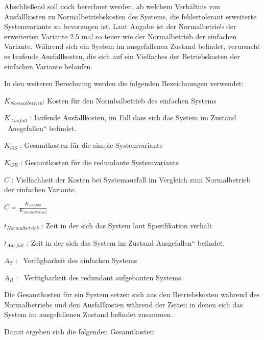 \documentclass[a4paper]{article}
\title{}
\author{}
\date{2015-06-18T21:48:05.083000000}
\begin{document}
Abschlie{\ss}end soll noch berechnet werden, ab welchem Verh\"altnis von
Ausfallkosten zu Normalbetriebskosten des Systems, die fehlertolerant
erweiterte Systemvariante zu bevorzugen ist. Laut Angabe ist der Normalbetrieb der erweiterten Variante 2.5 mal
so teuer wie der Normalbetrieb der einfachen Variante. W\"ahrend sich ein System
im ausgefallenen Zustand befindet, verursacht es laufende
Ausfallkosten, die sich auf ein Vielfaches der Betriebskosten der einfachen Variante belaufen.


\bigskip

In den weiteren Berechnung werden die folgenden Bezeichnungen verwendet:


\bigskip

 $K_{\mathit{Normalbetrieb}}$: Kosten f\"ur den Normbalbetrieb des
einfachen Systems

 $K_{\mathit{Ausfall}}$ : laufende Ausfallkosten, im Fall dass sich das
System im Zustand \ {\quotedblbase}Ausgefallen{\textquotedblleft}
befindet.

 $K_{\mathit{GS}}$ : Gesamtkosten f\"ur die simple Systemvariante

 $K_{\mathit{GR}}$ : Gesamtkosten f\"ur die redundante Systemvariante

 $C$ : Vielfachheit der Kosten bei Systemausfall im Vergleich zum Normalbetrieb der einfachen Variante.  
 
 $C=\frac{K_{\mathit{Ausfall}}}{K_{\mathit{Normalbetrieb}}}$ 


\bigskip

 $t_{\mathit{Normalbetrieb}}$ : Zeit in der sich das System laut
Spezifikation verh\"alt

 $t_{\mathit{Ausfall}}$ : Zeit in der sich das System im Zustand
{\quotedblbase}Ausgefallen{\textquotedblleft} befindet.


\bigskip

 $A_{S}$ : \ Verf\"ugbarkeit des einfachen Systems

 $A_{R}$ : \ Verf\"ugbarkeit des redundant aufgebauten Systems.


\bigskip

Die Gesamtkosten f\"ur ein System setzen sich aus den Betriebskosten
w\"ahrend des Normalbetriebs und den Ausfallkosten w\"ahrend der Zeiten
in denen sich das System im ausgefallenen Zustand befindet zusammen.


\bigskip

Damit ergeben sich die folgenden Gesamtkosten:


\bigskip
\end{document}
